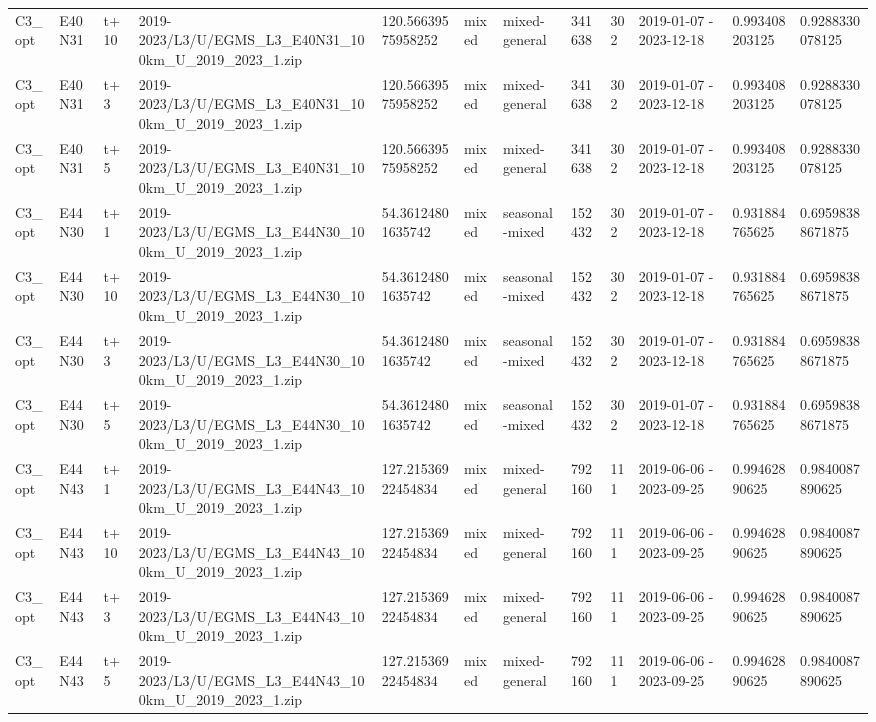 \begin{landscape}
\begin{longtable}{llllllllllll}
C3\_opt & E40N31 & t+10 & 2019-2023/L3/U/EGMS\_L3\_E40N31\_100km\_U\_2019\_2023\_1.zip & 120.56639575958252 & mixed & mixed-general & 341638 & 302 & 2019-01-07 - 2023-12-18 & 0.993408203125 & 0.9288330078125 \\
C3\_opt & E40N31 & t+3 & 2019-2023/L3/U/EGMS\_L3\_E40N31\_100km\_U\_2019\_2023\_1.zip & 120.56639575958252 & mixed & mixed-general & 341638 & 302 & 2019-01-07 - 2023-12-18 & 0.993408203125 & 0.9288330078125 \\
C3\_opt & E40N31 & t+5 & 2019-2023/L3/U/EGMS\_L3\_E40N31\_100km\_U\_2019\_2023\_1.zip & 120.56639575958252 & mixed & mixed-general & 341638 & 302 & 2019-01-07 - 2023-12-18 & 0.993408203125 & 0.9288330078125 \\
C3\_opt & E44N30 & t+1 & 2019-2023/L3/U/EGMS\_L3\_E44N30\_100km\_U\_2019\_2023\_1.zip & 54.36124801635742 & mixed & seasonal-mixed & 152432 & 302 & 2019-01-07 - 2023-12-18 & 0.931884765625 & 0.69598388671875 \\
C3\_opt & E44N30 & t+10 & 2019-2023/L3/U/EGMS\_L3\_E44N30\_100km\_U\_2019\_2023\_1.zip & 54.36124801635742 & mixed & seasonal-mixed & 152432 & 302 & 2019-01-07 - 2023-12-18 & 0.931884765625 & 0.69598388671875 \\
C3\_opt & E44N30 & t+3 & 2019-2023/L3/U/EGMS\_L3\_E44N30\_100km\_U\_2019\_2023\_1.zip & 54.36124801635742 & mixed & seasonal-mixed & 152432 & 302 & 2019-01-07 - 2023-12-18 & 0.931884765625 & 0.69598388671875 \\
C3\_opt & E44N30 & t+5 & 2019-2023/L3/U/EGMS\_L3\_E44N30\_100km\_U\_2019\_2023\_1.zip & 54.36124801635742 & mixed & seasonal-mixed & 152432 & 302 & 2019-01-07 - 2023-12-18 & 0.931884765625 & 0.69598388671875 \\
C3\_opt & E44N43 & t+1 & 2019-2023/L3/U/EGMS\_L3\_E44N43\_100km\_U\_2019\_2023\_1.zip & 127.21536922454834 & mixed & mixed-general & 792160 & 111 & 2019-06-06 - 2023-09-25 & 0.99462890625 & 0.9840087890625 \\
C3\_opt & E44N43 & t+10 & 2019-2023/L3/U/EGMS\_L3\_E44N43\_100km\_U\_2019\_2023\_1.zip & 127.21536922454834 & mixed & mixed-general & 792160 & 111 & 2019-06-06 - 2023-09-25 & 0.99462890625 & 0.9840087890625 \\
C3\_opt & E44N43 & t+3 & 2019-2023/L3/U/EGMS\_L3\_E44N43\_100km\_U\_2019\_2023\_1.zip & 127.21536922454834 & mixed & mixed-general & 792160 & 111 & 2019-06-06 - 2023-09-25 & 0.99462890625 & 0.9840087890625 \\
C3\_opt & E44N43 & t+5 & 2019-2023/L3/U/EGMS\_L3\_E44N43\_100km\_U\_2019\_2023\_1.zip & 127.21536922454834 & mixed & mixed-general & 792160 & 111 & 2019-06-06 - 2023-09-25 & 0.99462890625 & 0.9840087890625 \\

\end{longtable}
\end{landscape}
